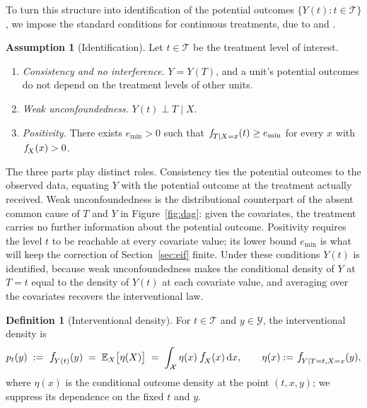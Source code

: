 \documentclass[11pt]{article}
\theoremstyle{plain}
\theoremstyle{definition}
\newtheorem{mydef}{Definition}
\newtheorem{assumption}{Assumption}
\theoremstyle{remark}
\newcommand{\pE}{\ensuremath{\mathbb{E}}}
\newcommand{\cX}{\ensuremath{\mathcal{X}}}
\newcommand{\cY}{\ensuremath{\mathcal{Y}}}
\newcommand{\cT}{\ensuremath{\mathcal{T}}}
\newcommand{\pf}[1]{\ensuremath{\,\mathlarger{\textit{f}}_{#1}}}
\newcommand{\dd}{\,\mathrm{d}}
\newcommand{\gps}{e}
\begin{document}
To turn this structure into identification of the potential outcomes
$\{Y(t) : t \in \cT\}$, we impose the standard conditions for continuous treatments, due to
\citet{imbens2000} and \citet{hirano2004}.

\begin{assumption}[Identification]
\label{as:identification}
Let $t \in \cT$ be the treatment level of interest.
\begin{enumerate}
\item[(i)] \emph{Consistency and no interference.} $Y = Y(T)$, and a unit's potential
outcomes do not depend on the treatment levels of other units.
\item[(ii)] \emph{Weak unconfoundedness.} $Y(t) \perp T \mid X$.
\item[(iii)] \emph{Positivity.} There exists $\gps_{\min} > 0$ such that
$\pf{T \mid X=x}(t) \ge \gps_{\min}$ for every $x$ with $\pf{X}(x) > 0$.
\end{enumerate}
\end{assumption}

The three parts play distinct roles. Consistency ties the potential outcomes to the observed
data, equating $Y$ with the potential outcome at the treatment actually received. Weak
unconfoundedness is the distributional counterpart of the absent common cause of $T$ and $Y$
in Figure~\ref{fig:dag}: given the covariates, the treatment carries no further information
about the potential outcome. Positivity requires the level $t$ to be reachable at every
covariate value; its lower bound $\gps_{\min}$ is what will keep the correction of
Section~\ref{sec:eif} finite. Under these conditions $Y(t)$ is identified, because weak
unconfoundedness makes the conditional density of $Y$ at $T=t$ equal to the density of $Y(t)$
at each covariate value, and averaging over the covariates recovers the interventional law.

\begin{mydef}[Interventional density]
\label{def:target}
For $t \in \cT$ and $y \in \cY$, the interventional density is
\begin{equation}
p_t(y) \;:=\; \pf{Y(t)}(y) \;=\; \pE_X\big[\eta(X)\big]
\;=\; \int_{\cX} \eta(x)\,\pf{X}(x) \dd x ,
\qquad
\eta(x) := \pf{Y \mid T=t,X=x}(y),
\label{eq:target}
\end{equation}
where $\eta(x)$ is the conditional outcome density at the point $(t,x,y)$; we suppress its
dependence on the fixed $t$ and $y$.
\end{mydef}
\end{document}
